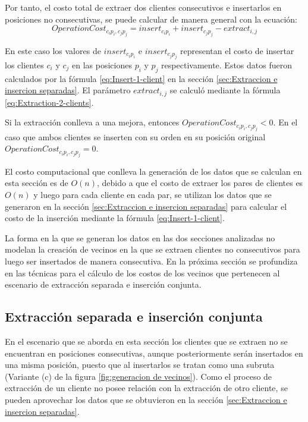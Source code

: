 \documentclass[12pt]{report}
\begin{document}
	Por tanto, el costo total de extraer dos clientes consecutivos e insertarlos en posiciones no consecutivas, se puede calcular de manera general con la ecuación:
	\begin{equation}
		 OperationCost_{c_ip_i,c_jp_j} = insert_{c_ip_i} + insert_{c_jp_j} - extract_{i,j}
		 \label{eq:OperationCost-extract-together}
	\end{equation}

     En este caso los valores de $insert_{c_ip_i}$ e $insert_{c_jp_j}$ representan el costo de insertar los clientes $c_i$ y $c_j$ en las posiciones $p_i$ y $p_j$ respectivamente. Estos datos fueron calculados por la fórmula \ref{eq:Insert-1-client} en la sección \ref{sec:Extraccion e insercion separadas}. El parámetro $extract_{i,j}$ se calculó mediante la fórmula \ref{eq:Extraction-2-clients}.

	Si la extracción conlleva a una mejora, entonces $OperationCost_{c_ip_i,c_jp_j} < 0$. En el caso que ambos clientes se inserten con su orden en su posición original $OperationCost_{c_ip_i,c_jp_j} = 0$.

	El costo computacional que conlleva la generación de los datos que se calculan en esta sección es de $O(n)$, debido a que el costo de extraer los pares de clientes es $O(n)$ y luego para cada cliente en cada par, se utilizan los datos que se generaron en la sección \ref{sec:Extraccion e insercion separadas} para calcular el costo de la inserción mediante la fórmula \ref{eq:Insert-1-client}.

	La forma en la que se generan los datos en las dos secciones analizadas no modelan la creación de vecinos en la que se extraen clientes no consecutivos para luego ser insertados de manera consecutiva. En la próxima sección se profundiza en las técnicas para el cálculo de los costos de los vecinos que pertenecen al escenario de extracción separada e inserción conjunta.

	\subsection{Extracción separada e inserción conjunta}
	\label{sec:Extracción separada e inserción conjunta}

	En el escenario que se aborda en esta sección los clientes que se extraen no se encuentran en posiciones consecutivas, aunque posteriormente serán insertados en una misma posición, puesto que al insertarlos se tratan como una subruta (Variante (c) de la figura \ref{fig:generacion de vecinos}). Como el proceso de extracción de un cliente no posee relación con la extracción de otro cliente, se pueden aprovechar los datos que se obtuvieron en la sección \ref{sec:Extraccion e insercion separadas}.
\end{document}
